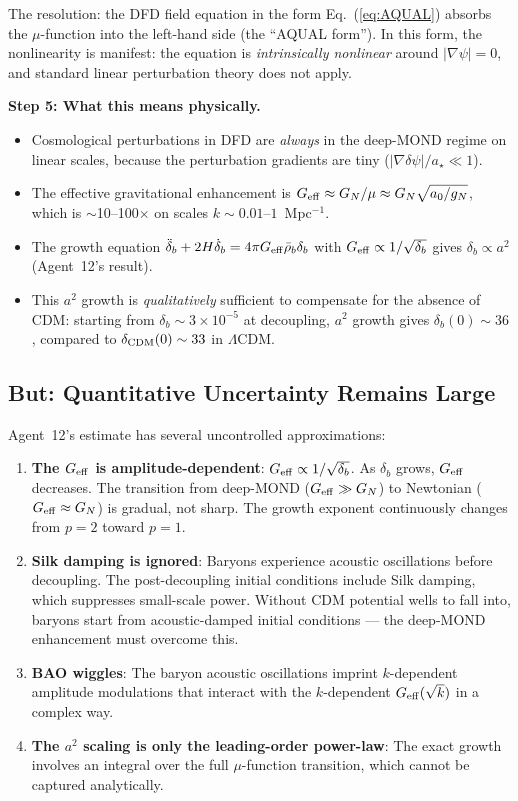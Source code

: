 \documentclass[11pt]{article}
\newcommand{\Geff}{G_{\rm eff}}
\newcommand{\GN}{G_N}
\newcommand{\astar}{a_\star}
\newcommand{\dpsi}{\delta\psi}
\newcommand{\ee}[1]{\times 10^{#1}}
\begin{document}
The resolution: the DFD field equation in the form Eq.~(\ref{eq:AQUAL})
absorbs the $\mu$-function into the left-hand side (the ``AQUAL form'').
In this form, the nonlinearity is manifest: the equation is
\emph{intrinsically nonlinear} around $|\nabla\psi| = 0$, and standard
linear perturbation theory does not apply.

\textbf{Step 5: What this means physically.}

\begin{itemize}
\item Cosmological perturbations in DFD are \emph{always} in the deep-MOND
  regime on linear scales, because the perturbation gradients are tiny
  ($|\nabla\dpsi|/\astar \ll 1$).
\item The effective gravitational enhancement is
  $\Geff \approx \GN/\mu \approx \GN\sqrt{a_0/g_N}$, which is
  $\sim$10--100$\times$ on scales $k \sim 0.01$--$1$~Mpc$^{-1}$.
\item The growth equation $\ddot\delta_b + 2H\dot\delta_b =
  4\pi\Geff\bar\rho_b\delta_b$ with $\Geff \propto 1/\sqrt{\delta_b}$
  gives $\delta_b \propto a^2$ (Agent~12's result).
\item This $a^2$ growth is \emph{qualitatively} sufficient to compensate
  for the absence of CDM: starting from $\delta_b \sim 3\ee{-5}$ at
  decoupling, $a^2$ growth gives $\delta_b(0) \sim 36$, compared to
  $\delta_{\rm CDM}(0) \sim 33$ in $\Lambda$CDM.
\end{itemize}

\subsection{But: Quantitative Uncertainty Remains Large}

Agent~12's estimate has several uncontrolled approximations:

\begin{enumerate}
\item \textbf{The $\Geff$ is amplitude-dependent}: $\Geff \propto
  1/\sqrt{\delta_b}$. As $\delta_b$ grows, $\Geff$ decreases. The
  transition from deep-MOND ($\Geff \gg \GN$) to Newtonian ($\Geff
  \approx \GN$) is gradual, not sharp. The growth exponent continuously
  changes from $p = 2$ toward $p = 1$.
\item \textbf{Silk damping is ignored}: Baryons experience acoustic
  oscillations before decoupling. The post-decoupling initial conditions
  include Silk damping, which suppresses small-scale power. Without CDM
  potential wells to fall into, baryons start from acoustic-damped
  initial conditions --- the deep-MOND enhancement must overcome this.
\item \textbf{BAO wiggles}: The baryon acoustic oscillations imprint
  $k$-dependent amplitude modulations that interact with the $k$-dependent
  $\Geff(\sqrt{k})$ in a complex way.
\item \textbf{The $a^2$ scaling is only the leading-order power-law}:
  The exact growth involves an integral over the full $\mu$-function
  transition, which cannot be captured analytically.
\end{enumerate}
\end{document}
